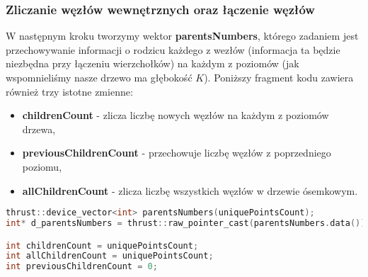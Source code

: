\documentclass[14pt,twoside,a4paper]{article}
\theoremstyle{definition}
\begin{document}
\subsubsection{\large Zliczanie węzłów wewnętrznych oraz łączenie węzłów}

W następnym kroku tworzymy wektor \textbf{parentsNumbers}, którego zadaniem jest przechowywanie informacji o rodzicu każdego z wezłów (informacja ta będzie niezbędna przy łączeniu wierzchołków) na każdym z poziomów (jak wspomnieliśmy nasze drzewo ma głębokość $K$). Poniższy fragment kodu zawiera również trzy istotne zmienne:
\begin{itemize}
\item \textbf{childrenCount} - zlicza liczbę nowych węzłów na każdym z poziomów drzewa,
\item \textbf{previousChildrenCount} - przechowuje liczbę węzłów z poprzedniego poziomu,
\item \textbf{allChildrenCount} - zlicza liczbę wszystkich węzłów w drzewie ósemkowym.
\end{itemize}

\begin{lstlisting}[language=C++, frame=single, framerule=2pt, caption=Przechowywanie węzłów drzewa]
thrust::device_vector<int> parentsNumbers(uniquePointsCount);
int* d_parentsNumbers = thrust::raw_pointer_cast(parentsNumbers.data());

int childrenCount = uniquePointsCount;
int allChildrenCount = uniquePointsCount;
int previousChildrenCount = 0;
\end{lstlisting}
\end{document}
